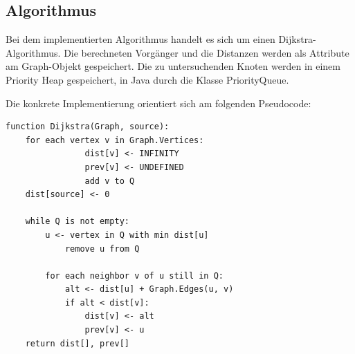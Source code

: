 \subsection{Algorithmus}
Bei dem implementierten Algorithmus handelt es sich um einen Dijkstra-Algorithmus. Die berechneten Vorgänger und die Distanzen werden als Attribute am Graph-Objekt gespeichert. Die zu untersuchenden Knoten werden in einem Priority Heap gespeichert, in Java durch die Klasse PriorityQueue.

Die konkrete Implementierung orientiert sich am folgenden Pseudocode:
\begin{lstlisting}[caption={Pseudocode Dijkstra von Wikipedia \cite{pseudocode}},captionpos=b]
function Dijkstra(Graph, source):
	for each vertex v in Graph.Vertices:
                dist[v] <- INFINITY
                prev[v] <- UNDEFINED
                add v to Q
	dist[source] <- 0

	while Q is not empty:
		u <- vertex in Q with min dist[u]
        	remove u from Q
        
		for each neighbor v of u still in Q:
			alt <- dist[u] + Graph.Edges(u, v)
			if alt < dist[v]:
				dist[v] <- alt
				prev[v] <- u
	return dist[], prev[]
\end{lstlisting}